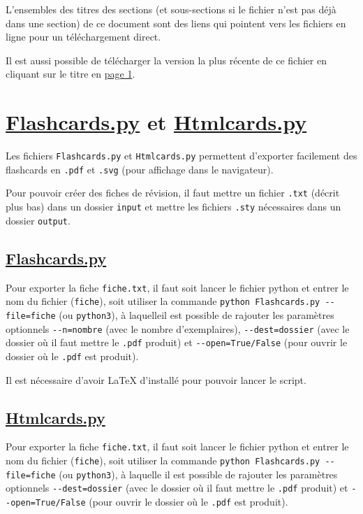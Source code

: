 \documentclass[a4paper,12pt]{article}
\let\oldsection\section
\newcommand{\ssection}[2][]{\clearpage\oldsection[#1]{#2}}
\newcounter{pagenb}
\begin{document}
\vspace{0.5cm}

L'ensembles des titres des sections (et sous-sections si le fichier n'est pas déjà dans une section) de ce document sont des liens qui pointent vers les fichiers en ligne pour un téléchargement direct.

Il est aussi possible de télécharger la version la plus récente de ce fichier en cliquant sur le titre en \hyperlink{section*.1}{page 1}.
\setcounter{pagenb}{\thepage}
\newpage
{}
\tableofcontents
\null\newpage
{}
\setcounter{page}{\thepagenb}
\ssection[Flashcards.py et Htmlcards.py]{\href{https://rfoxinter.github.io/revisions/Flashcards.py}{\color{black}Flashcards.py} et \href{https://rfoxinter.github.io/revisions/Htmlcards.py}{\color{black}Htmlcards.py}}
Les fichiers \texttt{Flashcards.py} et \texttt{Htmlcards.py} permettent d'exporter facilement des flashcards en \texttt{.pdf} et \texttt{.svg} (pour affichage dans le navigateur).

Pour pouvoir créer des fiches de révision, il faut mettre un fichier \texttt{.txt} (décrit plus bas) dans un dossier \texttt{input} et mettre les fichiers \texttt{.sty} nécessaires dans un dossier \texttt{output}.
\subsection[Flashcards.py]{\href{https://rfoxinter.github.io/revisions/Flashcards.py}{\color{black}Flashcards.py}}
Pour exporter la fiche \texttt{fiche.txt}, il faut soit lancer le fichier python et entrer le nom du fichier (\texttt{fiche}), soit utiliser la commande \texttt{python Flashcards.py -{}-file=fiche} (ou \texttt{python3}), à laquelleil est possible de rajouter les paramètres optionnels \texttt{-{}-n=nombre} (avec le nombre d'exemplaires), \texttt{-{}-dest=dossier} (avec le dossier où il faut mettre le \texttt{.pdf} produit) et \texttt{-{}-open=True/False} (pour ouvrir le dossier où le \texttt{.pdf} est produit).

Il est nécessaire d'avoir \LaTeX{} d'installé pour pouvoir lancer le script.
\subsection[Htmlcards.py]{\href{https://rfoxinter.github.io/revisions/Htmlcards.py}{\color{black}Htmlcards.py}}
Pour exporter la fiche \texttt{fiche.txt}, il faut soit lancer le fichier python et entrer le nom du fichier (\texttt{fiche}), soit utiliser la commande \texttt{python Flashcards.py -{}-file=fiche} (ou \texttt{python3}), à laquelle il est possible de rajouter les paramètres optionnels \texttt{-{}-dest=dossier} (avec le dossier où il faut mettre le \texttt{.pdf} produit) et \texttt{-{}-open=True/False} (pour ouvrir le dossier où le \texttt{.pdf} est produit).
\end{document}
